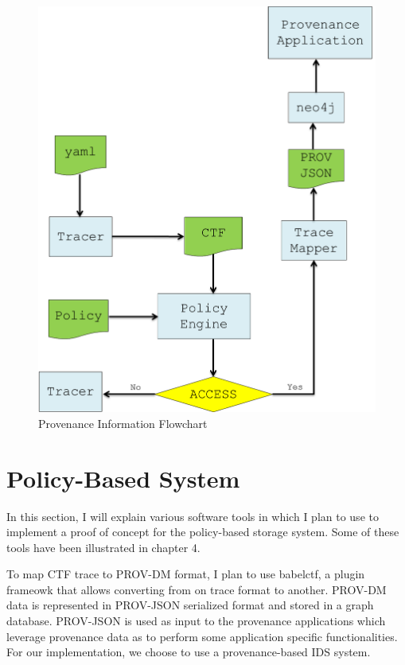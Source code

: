 \begin{figure}[tb]
\begin{center}

\includegraphics[width =4.5in]{flow_chart_update.PNG}    
\end{center}
\caption{Provenance Information Flowchart }
\label{flow_chart}
\end{figure}

\section{Policy-Based System}

In this section, I will explain various software tools in which I plan to use to implement a proof of concept for the policy-based storage system. Some of these tools have been illustrated in chapter 4. 


\par To map CTF trace to PROV-DM format, I plan to use babelctf, a plugin frameowk that allows converting from on trace format to another. PROV-DM data is represented in PROV-JSON serialized format and stored in a graph database. PROV-JSON is used as input to the provenance applications which leverage provenance data as to perform some application specific functionalities. For our implementation, we choose to use a provenance-based IDS system.

